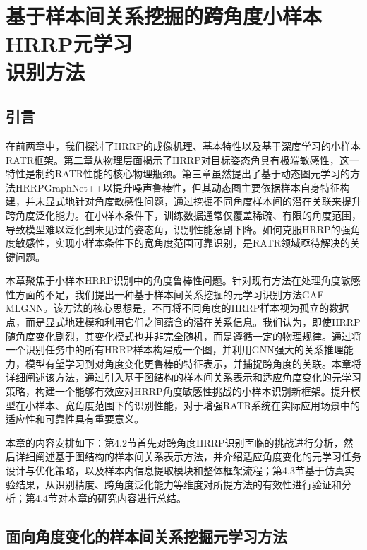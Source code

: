 \chapter[基于样本间关系挖掘的跨角度小样本HRRP元学习识别方法]{基于样本间关系挖掘的跨角度小样本HRRP元学习\protect\\ 识别方法}
\label{chap:angle_robust}

\section{引言}
\label{sec:angle_intro}

在前两章中，我们探讨了HRRP的成像机理、基本特性以及基于深度学习的小样本RATR框架。第二章从物理层面揭示了HRRP对目标姿态角具有极端敏感性，这一特性是制约RATR性能的核心物理瓶颈。第三章虽然提出了基于动态图元学习的方法HRRPGraphNet++以提升噪声鲁棒性，但其动态图主要依据样本自身特征构建，并未显式地针对角度敏感性问题，通过挖掘不同角度样本间的潜在关联来提升跨角度泛化能力。在小样本条件下，训练数据通常仅覆盖稀疏、有限的角度范围，导致模型难以泛化到未见过的姿态角，识别性能急剧下降。如何克服HRRP的强角度敏感性，实现小样本条件下的宽角度范围可靠识别，是RATR领域亟待解决的关键问题。

本章聚焦于小样本HRRP识别中的角度鲁棒性问题。针对现有方法在处理角度敏感性方面的不足，我们提出一种基于样本间关系挖掘的元学习识别方法GAF-MLGNN。该方法的核心思想是，不再将不同角度的HRRP样本视为孤立的数据点，而是显式地建模和利用它们之间蕴含的潜在关系信息。我们认为，即使HRRP随角度变化剧烈，其变化模式也并非完全随机，而是遵循一定的物理规律。通过将一个识别任务中的所有HRRP样本构建成一个图，并利用GNN强大的关系推理能力，模型有望学习到对角度变化更鲁棒的特征表示，并捕捉跨角度的关联。本章将详细阐述该方法，通过引入基于图结构的样本间关系表示和适应角度变化的元学习策略，构建一个能够有效应对HRRP角度敏感性挑战的小样本识别新框架。提升模型在小样本、宽角度范围下的识别性能，对于增强RATR系统在实际应用场景中的适应性和可靠性具有重要意义。

本章的内容安排如下：第4.2节首先对跨角度HRRP识别面临的挑战进行分析，然后详细阐述基于图结构的样本间关系表示方法，并介绍适应角度变化的元学习任务设计与优化策略，以及样本内信息提取模块和整体框架流程；第4.3节基于仿真实验结果，从识别精度、跨角度泛化能力等维度对所提方法的有效性进行验证和分析；第4.4节对本章的研究内容进行总结。

\section{面向角度变化的样本间关系挖掘元学习方法}
\label{sec:angle_method}

